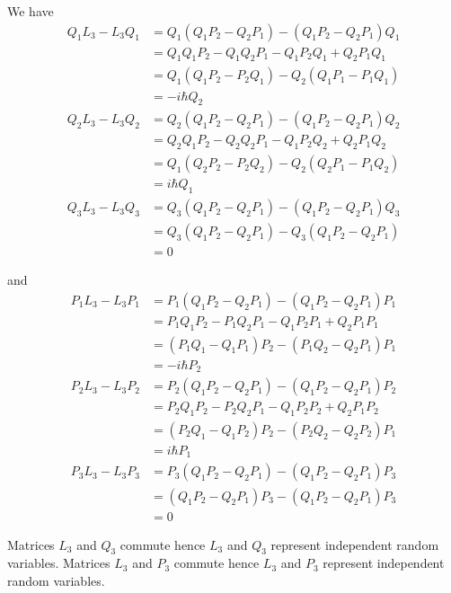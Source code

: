 


\bigskip
We have
\begin{align*}
Q_1L_3-L_3Q_1&=Q_1(Q_1P_2-Q_2P_1)-(Q_1P_2-Q_2P_1)Q_1
\\
&=Q_1Q_1P_2-Q_1Q_2P_1-Q_1P_2Q_1+Q_2P_1Q_1
\\
&=Q_1(Q_1P_2-P_2Q_1)-Q_2(Q_1P_1-P_1Q_1)
\\
&=-i\hbar Q_2
\\[1ex]
Q_2L_3-L_3Q_2&=Q_2(Q_1P_2-Q_2P_1)-(Q_1P_2-Q_2P_1)Q_2
\\
&=Q_2Q_1P_2-Q_2Q_2P_1-Q_1P_2Q_2+Q_2P_1Q_2
\\
&=Q_1(Q_2P_2-P_2Q_2)-Q_2(Q_2P_1-P_1Q_2)
\\
&=i\hbar Q_1
\\[1ex]
Q_3L_3-L_3Q_3&=Q_3(Q_1P_2-Q_2P_1)-(Q_1P_2-Q_2P_1)Q_3
\\
&=Q_3(Q_1P_2-Q_2P_1)-Q_3(Q_1P_2-Q_2P_1)
\\
&=0
\end{align*}

and
\begin{align*}
P_1L_3-L_3P_1&=P_1(Q_1P_2-Q_2P_1)-(Q_1P_2-Q_2P_1)P_1
\\
&=P_1Q_1P_2-P_1Q_2P_1-Q_1P_2P_1+Q_2P_1P_1
\\
&=(P_1Q_1-Q_1P_1)P_2-(P_1Q_2-Q_2P_1)P_1
\\
&=-i\hbar P_2
\\[1ex]
P_2L_3-L_3P_2&=P_2(Q_1P_2-Q_2P_1)-(Q_1P_2-Q_2P_1)P_2
\\
&=P_2Q_1P_2-P_2Q_2P_1-Q_1P_2P_2+Q_2P_1P_2
\\
&=(P_2Q_1-Q_1P_2)P_2-(P_2Q_2-Q_2P_2)P_1
\\
&=i\hbar P_1
\\[1ex]
P_3L_3-L_3P_3&=P_3(Q_1P_2-Q_2P_1)-(Q_1P_2-Q_2P_1)P_3
\\
&=(Q_1P_2-Q_2P_1)P_3-(Q_1P_2-Q_2P_1)P_3
\\
&=0
\end{align*}

Matrices $L_3$ and $Q_3$ commute hence $L_3$ and $Q_3$ represent independent random variables.
Matrices $L_3$ and $P_3$ commute hence $L_3$ and $P_3$ represent independent random variables.


